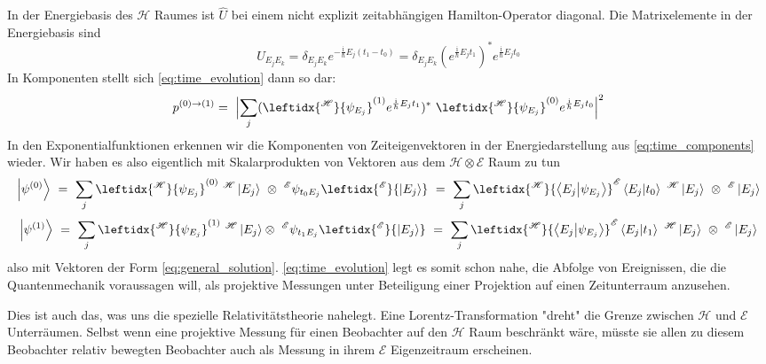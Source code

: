\documentclass[12pt]{article}
\begin{document}
In der Energiebasis des $\mathscr{H}$ Raumes ist $\hat{U}$ bei einem nicht explizit zeitabhängigen Hamilton-Operator diagonal. Die Matrixelemente in der Energiebasis sind 
\begin{equation} 
U_{E_j E_k} = \delta_{E_j E_k} e^{-\frac{\mathrm{i}}{\hbar}E_j(t_1-t_0)}
= 
\delta_{E_j E_k}(e^{\frac{\mathrm{i}}{\hbar}E_j t_1})^* e^{\frac{\mathrm{i}}{\hbar}E_j t_0}
\end{equation}
In Komponenten stellt sich \eqref{eq:time_evolution} dann so dar:
\begin{equation} 
p^{(0)\rightarrow(1)} =\ 
\Bigl| \sum_j
(\leftidx{^\mathscr{H}}{\psi_{E_j}}^{(1)} e^{\frac{\mathrm{i}}{\hbar}E_j t_1})^*\ 
\leftidx{^\mathscr{H}}{\psi_{E_j}}^{(0)} e^{\frac{\mathrm{i}}{\hbar}E_j t_0}
\Bigr|^2
\end{equation}
In den Exponentialfunktionen erkennen wir die Komponenten von Zeiteigenvektoren in der Energiedarstellung aus \eqref{eq:time_components} wieder.
Wir haben es also eigentlich mit Skalarprodukten von Vektoren aus dem $\mathscr{H}\otimes\mathscr{E}$ Raum zu tun
\begin{equation*}
\ket{\psi^{(0)}}\ =\ \sum_j \leftidx{^\mathscr{H}}{\psi_{E_j}}^{(0)}\ ^\mathscr{H}\ket{E_j} 
\ \otimes\ ^\mathscr{E}\psi_{t_0 E_j} \leftidx{^\mathscr{E}}{\ket{E_j}}
\ =\ \sum_j \leftidx{^\mathscr{H}}{\bra{E_j}\ket{\psi_{E_j}}} ^\mathscr{E}\bra{E_j}\ket{t_0} \ ^\mathscr{H}\ket{E_j}\ \otimes\ ^\mathscr{E}\ket{E_j}
\end{equation*}
\begin{equation*}
\ket{\psi^{(1)}}\ =\ \sum_j \leftidx{^\mathscr{H}}{\psi_{E_j}}^{(1)}\ ^\mathscr{H}\ket{E_j} 
\otimes\ ^\mathscr{E}\psi_{t_1 E_j} \leftidx{^\mathscr{E}}{\ket{E_j}}
\ =\ \sum_j \leftidx{^\mathscr{H}}{\bra{E_j}\ket{\psi_{E_j}}} ^\mathscr{E}\bra{E_j}\ket{t_1} \ ^\mathscr{H}\ket{E_j}\ \otimes\ ^\mathscr{E}\ket{E_j} 
\end{equation*}
also mit Vektoren der Form \eqref{eq:general_solution}. \eqref{eq:time_evolution} legt es somit schon nahe, die Abfolge von Ereignissen, die die Quantenmechanik voraussagen will, als projektive Messungen unter Beteiligung einer Projektion auf einen Zeitunterraum anzusehen. 

Dies ist auch das, was uns die spezielle Relativitätstheorie nahelegt. Eine Lorentz-Transformation "dreht" die Grenze zwischen $\mathscr{H}$ und $\mathscr{E}$ Unterräumen. Selbst wenn eine projektive Messung für einen Beobachter auf den $\mathscr{H}$ Raum beschränkt wäre, müsste sie allen zu diesem Beobachter relativ bewegten Beobachter auch als Messung in ihrem $\mathscr{E}$ Eigenzeitraum erscheinen.
\end{document}
